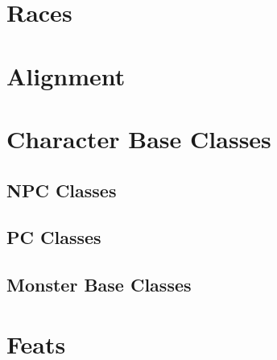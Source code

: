 \documentclass[10pt]{report}
\newcommand{\normalsections}{
\sectionfont{\noindent\rule{\textwidth}{0.015in}\\\nohang}
\subsectionfont{\noindent\rule{\textwidth}{0.005in}\\\nohang}
}
\newcommand{\itemspace}{\setlength{\itemsep}{-1mm}\setlength{\topsep}{-1mm} }
\begin{document}





\pagestyle{fancy}
\linespread{.9}  \small  \normalsize \itemspace \normalsections

\tableofcontents

\chapter{Races}


\chapter{Alignment}




\chapter{Character Base Classes}
\section{NPC Classes}



\section{PC Classes}














\section{Monster Base Classes}








\chapter{Feats}




\end{document}
